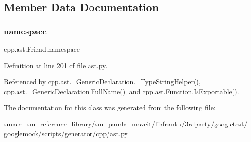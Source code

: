 \subsection{Member Data Documentation}
\mbox{\label{classcpp_1_1ast_1_1Friend_a076c68dddae9bd1e24d224d005538014}} 
\subsubsection{\texorpdfstring{namespace}{namespace}}
{\footnotesize\ttfamily cpp.\+ast.\+Friend.\+namespace}



Definition at line 201 of file ast.\+py.



Referenced by cpp.\+ast.\+\_\+\+Generic\+Declaration.\+\_\+\+Type\+String\+Helper(), cpp.\+ast.\+\_\+\+Generic\+Declaration.\+Full\+Name(), and cpp.\+ast.\+Function.\+Is\+Exportable().



The documentation for this class was generated from the following file\+:\begin{DoxyCompactItemize}
\item 
smacc\+\_\+sm\+\_\+reference\+\_\+library/sm\+\_\+panda\+\_\+moveit/libfranka/3rdparty/googletest/googlemock/scripts/generator/cpp/\hyperlink{ast_8py}{ast.\+py}\end{DoxyCompactItemize}
